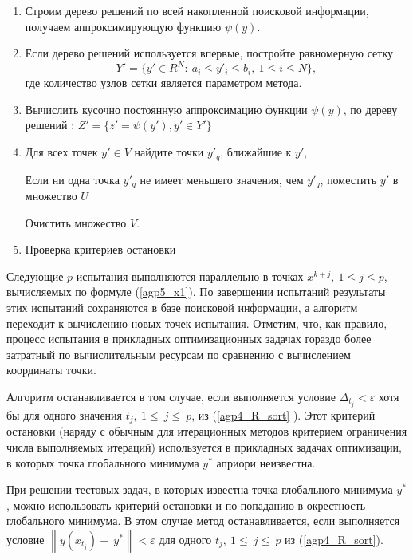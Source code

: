 \documentclass[runningheads]{llncs}
\begin{document}
\begin{enumerate}
	
	\item Строим дерево решений по всей накопленной поисковой информации, получаем аппроксимирующую функцию $\psi(y)$.
	
	\item Если дерево решений используется впервые, постройте равномерную сетку
	\begin{displaymath} 
		Y'=\{ y'\in R^N:\ a_i\le y'_i \le b_i,\ 1\le i\le N \},
	\end{displaymath} 
	где количество узлов сетки является параметром метода.
	
	\item Вычислить кусочно постоянную аппроксимацию функции $\psi(y)$, по дереву решений : $Z' = \{ z'=  \psi(y'), y' \in Y'\}$
	
	\item Для всех точек $y'\in V$ найдите точки $y'_q$, ближайшие к $y'$,
	
	Если ни одна точка $y'_q$ не имеет меньшего значения, чем $y'_q$, поместить $y'$ в множество $U$
	
	Очистить множество $V$.
	
	\item Проверка критериев остановки
	
	
\end{enumerate}

Следующие $p$ испытания выполняются параллельно в точках $x^{k+j},\ 1\leq j\leq p$, вычисляемых по формуле (\ref{agp5_x1}). По завершении испытаний результаты этих испытаний сохраняются в базе поисковой информации, а алгоритм переходит к вычислению новых точек испытания.
Отметим, что, как правило, процесс испытания в прикладных оптимизационных задачах гораздо более затратный по вычислительным ресурсам по сравнению с вычислением координаты точки.

Алгоритм останавливается в том случае, если выполняется условие \(\Delta_{t_j} < \varepsilon\) хотя бы для одного значения $t_j,\ 1\le\ j\le\ p$, из (\ref{agp4_R_sort} ). Этот критерий остановки (наряду с обычным для итерационных методов критерием ограничения числа выполняемых итераций) используется в прикладных задачах оптимизации, в которых точка глобального минимума $y^*$ априори неизвестна.

При решении тестовых задач, в которых известна точка глобального минимума $y^*$, можно использовать критерий остановки и по попаданию в окрестность глобального минимума. В этом случае метод останавливается, если выполняется условие $\left\|y(x_{t_j})-\ y^\ast\right\| < \varepsilon$ для одного $t_j,\ 1\le\ j\le\ p$ из (\ref{agp4_R_sort}).
\end{document}
